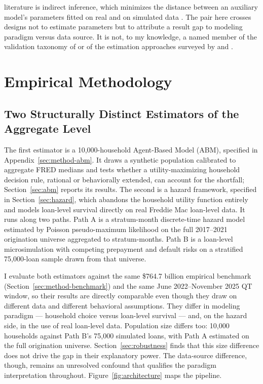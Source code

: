\documentclass[12pt]{article}
\begin{document}
literature is indirect inference, which minimizes the distance between an auxiliary model's parameters fitted on real and on simulated data \citep{platt2020}. The pair here crosses designs not to estimate parameters but to attribute a result gap to modeling paradigm versus data source. It is not, to my knowledge, a named member of the validation taxonomy of \citet{fagiolo2007} or of the estimation approaches surveyed by \citet{grazzini2017} and \citet{platt2020}.
\section{Empirical Methodology}\label{sec:method}

\subsection{Two Structurally Distinct Estimators of the Aggregate Level}\label{sec:method-estimators}

The first estimator is a 10,000-household Agent-Based Model (ABM), specified in Appendix~\ref{sec:method-abm}. It draws a synthetic population calibrated to aggregate FRED medians and tests whether a utility-maximizing household decision rule, rational or behaviorally extended, can account for the shortfall; Section~\ref{sec:abm} reports its results. The second is a hazard framework, specified in Section~\ref{sec:hazard}, which abandons the household utility function entirely and models loan-level survival directly on real Freddie Mac loan-level data. It runs along two paths. Path A is a stratum-month discrete-time hazard model estimated by Poisson pseudo-maximum likelihood on the full 2017--2021 origination universe aggregated to stratum-months. Path B is a loan-level microsimulation with competing prepayment and default risks on a stratified 75,000-loan sample drawn from that universe.

I evaluate both estimators against the same \$764.7 billion empirical benchmark (Section~\ref{sec:method-benchmark}) and the same June 2022--November 2025 QT window, so their results are directly comparable even though they draw on different data and different behavioral assumptions. They differ in modeling paradigm --- household choice versus loan-level survival --- and, on the hazard side, in the use of real loan-level data. Population size differs too: 10,000 households against Path B's 75,000 simulated loans, with Path A estimated on the full origination universe. Section~\ref{sec:robustness} finds that this size difference does not drive the gap in their explanatory power. The data-source difference, though, remains an unresolved confound that qualifies the paradigm interpretation throughout. Figure~\ref{fig:architecture} maps the pipeline.
\end{document}
